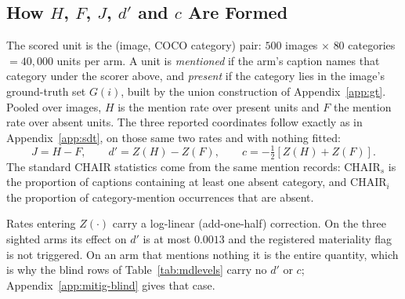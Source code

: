 \subsection{How $H$, $F$, $J$, $d'$ and $c$ Are Formed}
\label{app:mitig-rates}

The scored unit is the (image, COCO category) pair: $500$ images $\times$ $80$ categories
$= 40{,}000$ units per arm. A unit is \emph{mentioned} if the arm's caption names that category
under the scorer above, and \emph{present} if the category lies in the image's ground-truth set
$G(i)$, built by the union construction of Appendix~\ref{app:gt}. Pooled over images, $H$ is the
mention rate over present units and $F$ the mention rate over absent units. The three reported
coordinates follow exactly as in Appendix~\ref{app:sdt}, on those same two rates and with nothing
fitted:
\[
J = H - F, \qquad d' = Z(H) - Z(F), \qquad c = -\tfrac{1}{2}\left[Z(H) + Z(F)\right].
\]
The standard CHAIR statistics come from the same mention records: $\mathrm{CHAIR}_s$ is the
proportion of captions containing at least one absent category, and $\mathrm{CHAIR}_i$ the
proportion of category-mention occurrences that are absent.

Rates entering $Z(\cdot)$ carry a log-linear (add-one-half) correction. On the three sighted arms
its effect on $d'$ is at most $0.0013$ and the registered materiality flag is not triggered. On an arm
that mentions nothing it is the entire quantity, which is why the blind rows of
Table~\ref{tab:mdlevels} carry no $d'$ or $c$; Appendix~\ref{app:mitig-blind} gives that case.


